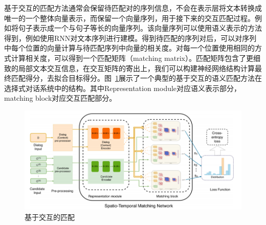 基于交互的匹配方法通常会保留待匹配对的序列信息，不会在表示层将文本转换成唯一的一个整体向量表示，而保留一个向量序列，用于接下来的交互匹配过程。例如将句子表示成一个与句子等长的向量序列。该向量序列可以使用语义表示的方法得到，例如使用RNN对文本序列进行建模。得到待匹配的序列对后，可以对序列中每个位置的向量计算与待匹配序列中向量的相关度。对每一个位置使用相同的方式计算相关度，可以得到一个匹配矩阵（matching matrix）。匹配矩阵包含了更细致的局部文本交互信息，在交互矩阵的寄出上，我们可以构建神经网络结构计算最终匹配得分，去拟合目标得分。图~\ref{fig:interaction_based_matching}展示了一个典型的基于交互的语义匹配方法在选择式对话系统中的结构。其中Representation module对应语义表示部分，matching block对应交互匹配部分。

\begin{figure}[h!]
\centering
\includegraphics[scale=0.8]{img/chapter_nlp/guang_match_2.png}
\caption{基于交互的匹配}
\label{fig:interaction_based_matching}
\end{figure}

